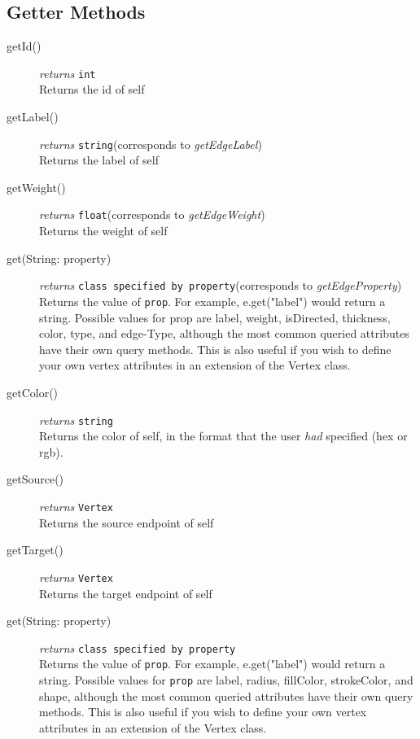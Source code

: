 \documentclass{article}
\newcounter{example}
\newlength\q
\begin{document}
\subsection{Getter Methods}
\begin{description}
\item[getId()] \emph{returns} \texttt{int}\\
Returns the id of self

\label{getEdgeLabelClass}\item[getLabel()] \emph{returns} \texttt{string}\quad(corresponds to \textit{getEdgeLabel})\\
Returns the label of self

\label{getEdgeWeightClass}\item[getWeight()] \emph{returns} \texttt{float}\quad(corresponds to \textit{getEdgeWeight})
\\
Returns the weight of self


\label{getEdgePropertyClass}\item[get(String: property)] \emph{returns} \texttt{class specified by property}\quad(corresponds to \textit{getEdgeProperty})\\
Returns the value of \texttt{prop}. For example, e.get("label") would return a string. Possible values for prop are label, weight, isDirected, thickness, color, type, and edge-Type, although the most common queried attributes have their own query methods. This is also useful if you wish to define your own vertex attributes in an extension of the Vertex class.

\item[getColor()] \emph{returns} \texttt{string}\\
Returns the color of self, in the format that the user \textit{had} specified (hex or rgb).

\item[getSource()] \emph{returns} \texttt{Vertex}\\
Returns the source endpoint of self

\item[getTarget()] \emph{returns} \texttt{Vertex}\\
Returns the target endpoint of self

\item[get(String: property)] \emph{returns} \texttt{class specified by property}\\
Returns the value of \texttt{prop}. For example, e.get("label") would return a string. Possible values for \texttt{prop} are label, radius, fillColor, strokeColor, and shape, although the most common queried attributes have their own query methods. This is also useful if you wish to define your own vertex attributes in an extension of the Vertex class.


\end{description}
\end{document}

